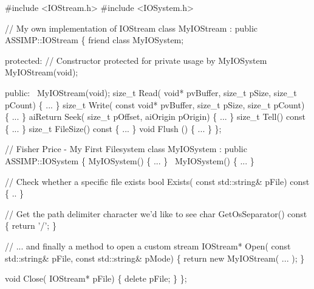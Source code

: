 \begin{DoxyCode}
\textcolor{preprocessor}{#include <IOStream.h>}
\textcolor{preprocessor}{#include <IOSystem.h>}

\textcolor{comment}{// My own implementation of IOStream}
\textcolor{keyword}{class }MyIOStream : \textcolor{keyword}{public} ASSIMP::IOStream
\{
  \textcolor{keyword}{friend} \textcolor{keyword}{class }MyIOSystem;

\textcolor{keyword}{protected}:
  \textcolor{comment}{// Constructor protected for private usage by MyIOSystem}
  MyIOStream(\textcolor{keywordtype}{void});

\textcolor{keyword}{public}:
  ~MyIOStream(\textcolor{keywordtype}{void});
  \textcolor{keywordtype}{size\_t} Read( \textcolor{keywordtype}{void}* pvBuffer, \textcolor{keywordtype}{size\_t} pSize, \textcolor{keywordtype}{size\_t} pCount) \{ ... \}
  \textcolor{keywordtype}{size\_t} Write( \textcolor{keyword}{const} \textcolor{keywordtype}{void}* pvBuffer, \textcolor{keywordtype}{size\_t} pSize, \textcolor{keywordtype}{size\_t} pCount) \{ ... \}
  aiReturn Seek( \textcolor{keywordtype}{size\_t} pOffset, aiOrigin pOrigin) \{ ... \}
  \textcolor{keywordtype}{size\_t} Tell()\textcolor{keyword}{ const }\{ ... \}
  \textcolor{keywordtype}{size\_t} FileSize()\textcolor{keyword}{ const }\{ ... \}
  \textcolor{keywordtype}{void} Flush () \{ ... \}
\};

\textcolor{comment}{// Fisher Price - My First Filesystem}
\textcolor{keyword}{class }MyIOSystem : \textcolor{keyword}{public} ASSIMP::IOSystem
\{
  MyIOSystem() \{ ... \}
  ~MyIOSystem() \{ ... \}

  \textcolor{comment}{// Check whether a specific file exists}
  \textcolor{keywordtype}{bool} Exists( \textcolor{keyword}{const} std::string& pFile)\textcolor{keyword}{ const }\{
    .. 
  \}

  \textcolor{comment}{// Get the path delimiter character we'd like to see}
  \textcolor{keywordtype}{char} GetOsSeparator()\textcolor{keyword}{ const }\{ 
    \textcolor{keywordflow}{return} \textcolor{charliteral}{'/'}; 
  \}

  \textcolor{comment}{// ... and finally a method to open a custom stream}
  IOStream* Open( \textcolor{keyword}{const} std::string& pFile, \textcolor{keyword}{const} std::string& pMode) \{
    \textcolor{keywordflow}{return} \textcolor{keyword}{new} MyIOStream( ... ); 
  \}

  \textcolor{keywordtype}{void} Close( IOStream* pFile) \{ \textcolor{keyword}{delete} pFile; \}
\};
\end{DoxyCode}


